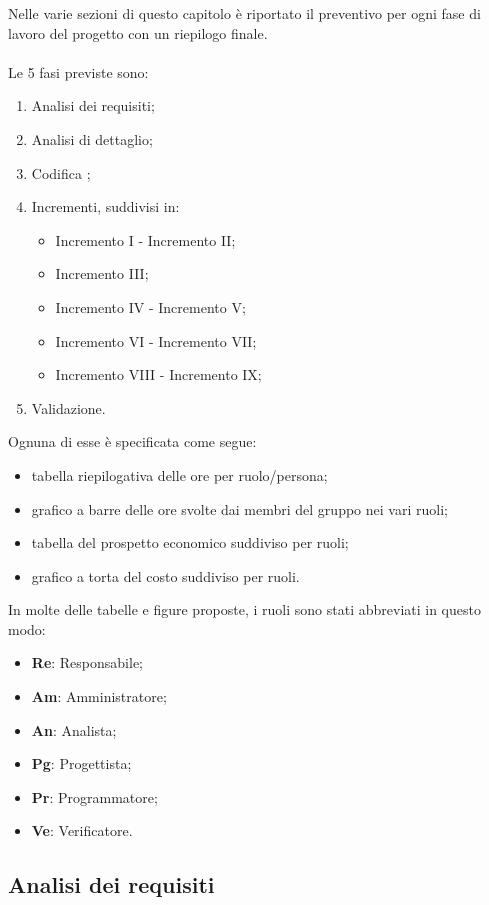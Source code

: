 
Nelle varie sezioni di questo capitolo è riportato il preventivo per ogni fase di lavoro del progetto con un riepilogo finale.\\
\\Le 5 fasi previste sono:
\begin{enumerate}
	\item Analisi dei requisiti;
	\item Analisi di dettaglio;
	\item Codifica ;
	\item Incrementi, suddivisi in:
	\begin{itemize}
		\item Incremento I - Incremento II;
		\item Incremento III;
		\item Incremento IV - Incremento V;
		\item Incremento VI - Incremento VII;
		\item Incremento VIII - Incremento IX;
		
	\end{itemize}
	\item Validazione.
\end{enumerate}
Ognuna di esse è specificata come segue:
\begin{itemize}
	\item tabella riepilogativa delle ore per ruolo/persona;
	\item grafico a barre delle ore svolte dai membri del gruppo nei vari ruoli;
	\item tabella del prospetto economico suddiviso per ruoli;
	\item grafico a torta del costo suddiviso per ruoli.
\end{itemize}
In molte delle tabelle e figure proposte, i ruoli sono stati abbreviati in questo modo:
\begin{itemize}
	\item \textbf{Re}: Responsabile;
	\item \textbf{Am}: Amministratore;
	\item \textbf{An}: Analista;
	\item \textbf{Pg}: Progettista;
	\item \textbf{Pr}: Programmatore;
	\item \textbf{Ve}: Verificatore.
\end{itemize}

\newpage

\subsection{Analisi dei requisiti}
	
